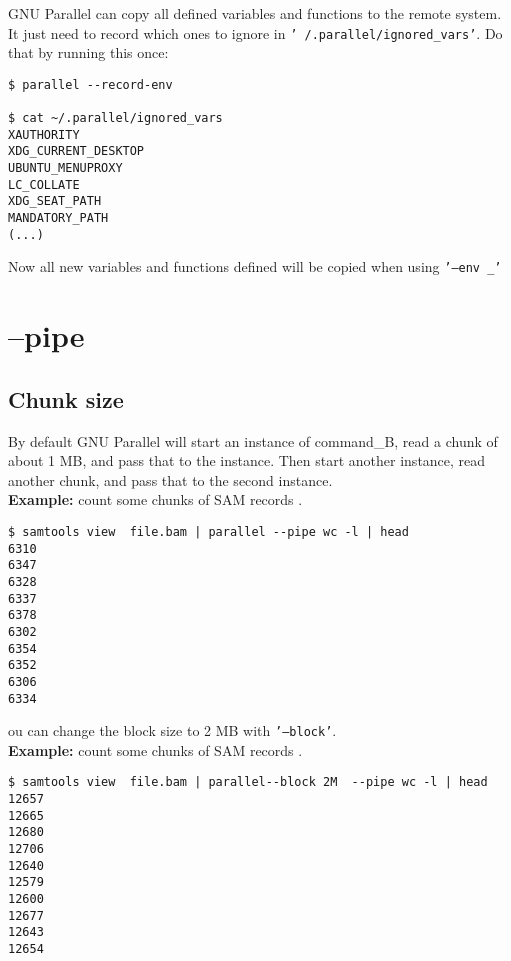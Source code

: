 \documentclass{article}
\newcommand{\example}[1]{
\textbf{Example: } {\color[rgb]{0,0,1} #1 } .
}
\newcommand{\cmdoption}[1]{\texttt{'#1'}}
\begin{document}
GNU Parallel can copy all defined variables and functions to the remote system. It just need to record which ones to ignore in \cmdoption{~/.parallel/ignored\_vars}. Do that by running this once:
\begin{lstlisting}
$ parallel --record-env

$ cat ~/.parallel/ignored_vars 
XAUTHORITY
XDG_CURRENT_DESKTOP
UBUNTU_MENUPROXY
LC_COLLATE
XDG_SEAT_PATH
MANDATORY_PATH
(...)
\end{lstlisting}
Now all new variables and functions defined will be copied when using  \cmdoption{--env \_}

%

\section{--pipe}
\subsection{Chunk size}
By default GNU Parallel will start an instance of command\_B, read a chunk of about 1 MB, and pass that to the instance. Then start another instance, read another chunk, and pass that to the second instance.\\
\example{count some chunks of SAM records}
\begin{lstlisting}
$ samtools view  file.bam | parallel --pipe wc -l | head
6310
6347
6328
6337
6378
6302
6354
6352
6306
6334
\end{lstlisting}
ou can change the block size to 2 MB with  \cmdoption{--block}.\\
\example{count some chunks of SAM records}
\begin{lstlisting}
$ samtools view  file.bam | parallel--block 2M  --pipe wc -l | head
12657
12665
12680
12706
12640
12579
12600
12677
12643
12654
\end{lstlisting}
\end{document}
